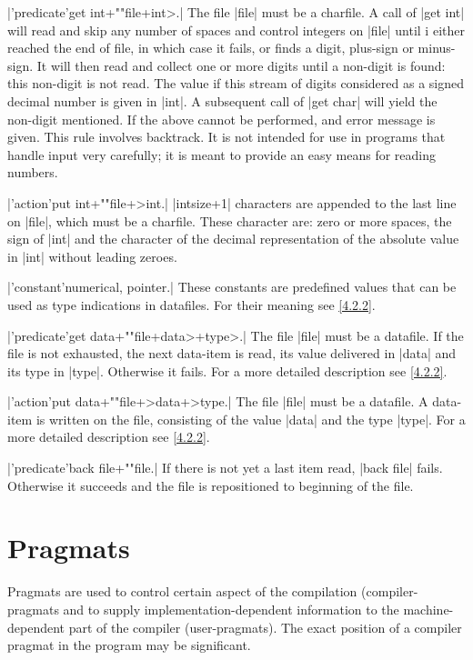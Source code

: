 \documentclass{article}
\newcommand\g[1]{{\sf #1}}
\begin{document}
\X\pp|'predicate'get int+""file+int>.|\Y
The file \pp|file| must be a charfile. A call of \pp|get int| will read and
skip any number of spaces and control integers on \pp|file| until i either
reached the end of file, in which case it fails, or finds a digit, plus-sign
or minus-sign. It will then read and collect one or more digits until a
non-digit is found: this non-digit is not read. The value if this stream of
digits considered as a signed decimal number is given in \pp|int|.
A subsequent call of \pp|get char| will yield the non-digit mentioned. If
the above cannot be performed, and error message is given.
This rule involves backtrack. It is not intended for use in programs that
handle input very carefully; it is meant to provide an easy means for
reading numbers.

\X\pp|'action'put int+""file+>int.|\Y
\pp|intsize+1| characters are appended to the last line on \pp|file|, which
must be a charfile. These character are: zero or more spaces, the sign of
\pp|int| and the character of the decimal representation of the absolute
value in \pp|int| without leading zeroes.

\X\pp|'constant'numerical, pointer.|\Y
These constants are predefined values that can be used as type indications
in datafiles. For their meaning see \ref{4.2.2}.

\X\pp|'predicate'get data+""file+data>+type>.|\Y
The file \pp|file| must be a datafile. If the file is not exhausted, the
next data-item is read, its value delivered in \pp|data| and its type in
\pp|type|. Otherwise it fails. For a more detailed description see
\ref{4.2.2}.

\X\pp|'action'put data+""file+>data+>type.|\Y
The file \pp|file| must be a datafile. A data-item is written on the file,
consisting of the value \pp|data| and the type \pp|type|. For a more
detailed description see \ref{4.2.2}.

\X\pp|'predicate'back file+""file.|\Y
If there is not yet a last item read, \pp|back file| fails. Otherwise it
succeeds and the file is repositioned to
beginning of the file.


\section{Pragmats}\label{sec:6}

Pragmats are used to control certain aspect of the compilation
(\g{compiler-pragmats} and to supply implementation-dependent information to
the machine-dependent part of the compiler (\g{user-pragmats}). The exact
position of a compiler pragmat in the program may be significant.
\end{document}
